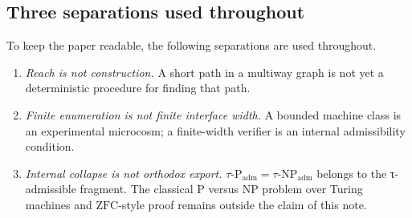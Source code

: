 \documentclass{pantarhei-researchnote}
\newcommand{\Padm}{\ensuremath{\tau\text{-}\mathrm{P}_{\mathrm{adm}}}}
\newcommand{\NPadm}{\ensuremath{\tau\text{-}\mathrm{NP}_{\mathrm{adm}}}}
\newcommand{\ZFC}{\ensuremath{\mathrm{ZFC}}}
\newcommand{\ClassP}{\ensuremath{\mathrm{P}}}
\newcommand{\ClassNP}{\ensuremath{\mathrm{NP}}}
\begin{document}
\subsection{Three separations used throughout}

To keep the paper readable, the following separations are used
throughout.

\begin{enumerate}[leftmargin=1.2em,itemsep=1pt,topsep=2pt]
\item \emph{Reach is not construction.} A short path in a multiway graph
is not yet a deterministic procedure for finding that path.
\item \emph{Finite enumeration is not finite interface width.} A bounded
machine class is an experimental microcosm; a finite-width verifier is an
internal admissibility condition.
\item \emph{Internal collapse is not orthodox export.}
\(\Padm=\NPadm\) belongs to the τ-admissible fragment. The classical
\(\ClassP\) versus \(\ClassNP\) problem over Turing machines and
\ZFC-style proof remains outside the claim of this note.
\end{enumerate}
\end{document}
